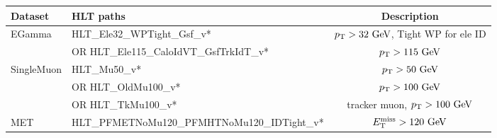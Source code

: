 \footnotesize
\begin{tabular}{l|l|c}
  \hline
  Dataset        & HLT paths                                    & Description\\
  \hline \hline
  \ttfamily EGamma         & \ttfamily HLT\_Ele32\_WPTight\_Gsf\_v*                 & $\pt>32\unit{GeV}$, Tight WP for ele ID  \\
                 & \ttfamily OR HLT\_Ele115\_CaloIdVT\_GsfTrkIdT\_v*      & $\pt>115\unit{GeV}$  \\
  \hline
  \ttfamily SingleMuon     & \ttfamily HLT\_Mu50\_v*                                & $\pt>50\unit{GeV}$ \\
                 & \ttfamily OR HLT\_OldMu100\_v*                         & $\pt>100\unit{GeV}$ \\
                 & \ttfamily OR HLT\_TkMu100\_v*                          & tracker muon, $\pt>100\unit{GeV}$ \\
  \hline
  \ttfamily MET            & \ttfamily HLT\_PFMETNoMu120\_PFMHTNoMu120\_IDTight\_v* & $\Etmiss>120\unit{GeV}$ \\
  \hline
\end{tabular}

